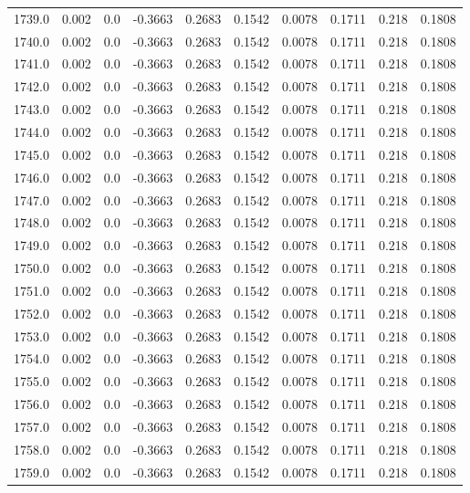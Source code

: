 \begin{longtable}{lrrrrrrrrr}
1739.0 & 0.002 & 0.0 & -0.3663 & 0.2683 & 0.1542 & 0.0078 & 0.1711 & 0.218 & 0.1808 \\
1740.0 & 0.002 & 0.0 & -0.3663 & 0.2683 & 0.1542 & 0.0078 & 0.1711 & 0.218 & 0.1808 \\
1741.0 & 0.002 & 0.0 & -0.3663 & 0.2683 & 0.1542 & 0.0078 & 0.1711 & 0.218 & 0.1808 \\
1742.0 & 0.002 & 0.0 & -0.3663 & 0.2683 & 0.1542 & 0.0078 & 0.1711 & 0.218 & 0.1808 \\
1743.0 & 0.002 & 0.0 & -0.3663 & 0.2683 & 0.1542 & 0.0078 & 0.1711 & 0.218 & 0.1808 \\
1744.0 & 0.002 & 0.0 & -0.3663 & 0.2683 & 0.1542 & 0.0078 & 0.1711 & 0.218 & 0.1808 \\
1745.0 & 0.002 & 0.0 & -0.3663 & 0.2683 & 0.1542 & 0.0078 & 0.1711 & 0.218 & 0.1808 \\
1746.0 & 0.002 & 0.0 & -0.3663 & 0.2683 & 0.1542 & 0.0078 & 0.1711 & 0.218 & 0.1808 \\
1747.0 & 0.002 & 0.0 & -0.3663 & 0.2683 & 0.1542 & 0.0078 & 0.1711 & 0.218 & 0.1808 \\
1748.0 & 0.002 & 0.0 & -0.3663 & 0.2683 & 0.1542 & 0.0078 & 0.1711 & 0.218 & 0.1808 \\
1749.0 & 0.002 & 0.0 & -0.3663 & 0.2683 & 0.1542 & 0.0078 & 0.1711 & 0.218 & 0.1808 \\
1750.0 & 0.002 & 0.0 & -0.3663 & 0.2683 & 0.1542 & 0.0078 & 0.1711 & 0.218 & 0.1808 \\
1751.0 & 0.002 & 0.0 & -0.3663 & 0.2683 & 0.1542 & 0.0078 & 0.1711 & 0.218 & 0.1808 \\
1752.0 & 0.002 & 0.0 & -0.3663 & 0.2683 & 0.1542 & 0.0078 & 0.1711 & 0.218 & 0.1808 \\
1753.0 & 0.002 & 0.0 & -0.3663 & 0.2683 & 0.1542 & 0.0078 & 0.1711 & 0.218 & 0.1808 \\
1754.0 & 0.002 & 0.0 & -0.3663 & 0.2683 & 0.1542 & 0.0078 & 0.1711 & 0.218 & 0.1808 \\
1755.0 & 0.002 & 0.0 & -0.3663 & 0.2683 & 0.1542 & 0.0078 & 0.1711 & 0.218 & 0.1808 \\
1756.0 & 0.002 & 0.0 & -0.3663 & 0.2683 & 0.1542 & 0.0078 & 0.1711 & 0.218 & 0.1808 \\
1757.0 & 0.002 & 0.0 & -0.3663 & 0.2683 & 0.1542 & 0.0078 & 0.1711 & 0.218 & 0.1808 \\
1758.0 & 0.002 & 0.0 & -0.3663 & 0.2683 & 0.1542 & 0.0078 & 0.1711 & 0.218 & 0.1808 \\
1759.0 & 0.002 & 0.0 & -0.3663 & 0.2683 & 0.1542 & 0.0078 & 0.1711 & 0.218 & 0.1808 \\

\end{longtable}
